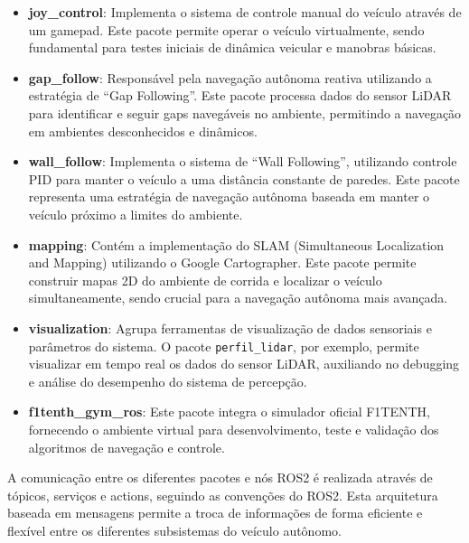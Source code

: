 \begin{itemize}
    \item \textbf{joy\_control}: Implementa o sistema de controle manual do veículo através de um
          gamepad. Este pacote permite operar o veículo virtualmente, sendo fundamental para
          testes iniciais de dinâmica veicular e manobras básicas.

    \item \textbf{gap\_follow}: Responsável pela navegação autônoma reativa utilizando a estratégia
          de ``Gap Following''. Este pacote processa dados do sensor LiDAR para identificar e
          seguir gaps navegáveis no ambiente, permitindo a navegação em ambientes desconhecidos
          e dinâmicos.

    \item \textbf{wall\_follow}: Implementa o sistema de ``Wall Following'', utilizando controle
          PID para manter o veículo a uma distância constante de paredes. Este pacote representa
          uma estratégia de navegação autônoma baseada em manter o veículo próximo a limites
          do ambiente.

    \item \textbf{mapping}: Contém a implementação do SLAM (Simultaneous Localization and Mapping)
          utilizando o Google Cartographer. Este pacote permite construir mapas 2D do ambiente
          de corrida e localizar o veículo simultaneamente, sendo crucial para a navegação
          autônoma mais avançada.

    \item \textbf{visualization}: Agrupa ferramentas de visualização de dados sensoriais e
          parâmetros do sistema. O pacote \texttt{perfil\_lidar}, por exemplo, permite visualizar
          em tempo real os dados do sensor LiDAR, auxiliando no debugging e análise do desempenho
          do sistema de percepção.

    \item \textbf{f1tenth\_gym\_ros}: Este pacote integra o simulador oficial F1TENTH, fornecendo
          o ambiente virtual para desenvolvimento, teste e validação dos algoritmos de navegação
          e controle.
\end{itemize}

A comunicação entre os diferentes pacotes e nós ROS2 é realizada através de
tópicos, serviços e actions, seguindo as convenções do ROS2. Esta arquitetura
baseada em mensagens permite a troca de informações de forma eficiente e
flexível entre os diferentes subsistemas do veículo autônomo.

